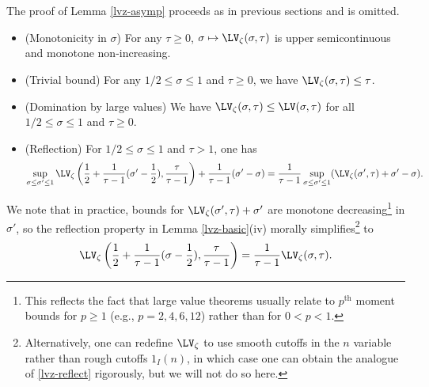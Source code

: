 The proof of Lemma \ref{lvz-asymp} proceeds as in previous sections and is omitted.

\begin{lemma}\label{lvz-basic}
    \begin{itemize}
        \item[(i)] (Monotonicity in $\sigma$) For any $\tau \geq 0$, $\sigma \mapsto \LV_\zeta(\sigma,\tau)$ is upper semicontinuous and monotone non-increasing.
        \item[(ii)] (Trivial bound) For any $1/2 \leq \sigma \leq 1$ and $\tau \geq 0$, we have $\LV_\zeta(\sigma,\tau) \leq \tau$.
        \item[(iii)] (Domination by large values)  We have $\LV_\zeta(\sigma,\tau) \leq \LV(\sigma,\tau)$ for all $1/2 \leq \sigma \leq 1$ and $\tau \geq 0$.
        \item[(iv)] (Reflection) For $1/2 \leq \sigma \leq 1$ and $\tau > 1$, one has
              $$ \sup_{\sigma \leq \sigma' \leq 1} \LV_\zeta\left(\frac{1}{2} + \frac{1}{\tau-1} (\sigma'-\frac{1}{2}), \frac{\tau}{\tau-1}\right) + \frac{1}{\tau-1} (\sigma'-\sigma) = \frac{1}{\tau-1} \sup_{\sigma \leq \sigma' \leq 1} (\LV_\zeta(\sigma',\tau) + \sigma'-\sigma).$$
    \end{itemize}
\end{lemma}


We note that in practice, bounds for $\LV_\zeta(\sigma',\tau)+\sigma'$ are monotone decreasing\footnote{This reflects the fact that large value theorems usually relate to $p^{\mathrm{th}}$ moment bounds for $p \geq 1$ (e.g., $p = 2, 4, 6, 12$) rather than for $0 < p < 1$.} in $\sigma'$, so the reflection property in Lemma \ref{lvz-basic}(iv) morally simplifies\footnote{Alternatively, one can redefine $\LV_\zeta$ to use smooth cutoffs in the $n$ variable rather than rough cutoffs $1_I(n)$, in which case one can obtain the analogue of \eqref{lvz-reflect} rigorously, but we will not do so here.} to
\begin{equation}\label{lvz-reflect}
    \LV_\zeta\left(\frac{1}{2} + \frac{1}{\tau-1} (\sigma-\frac{1}{2}), \frac{\tau}{\tau-1}\right) = \frac{1}{\tau-1} \LV_\zeta(\sigma,\tau).
\end{equation}


